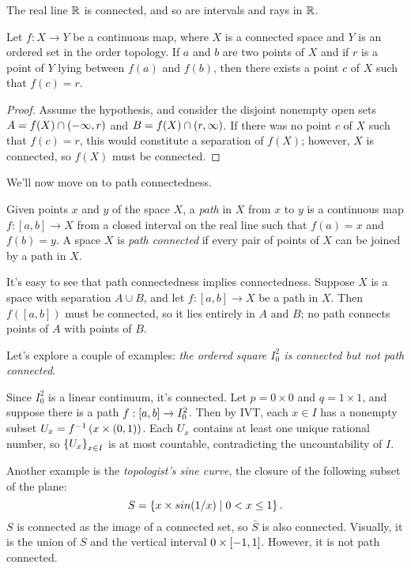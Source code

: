 \documentclass[10pt]{report}
\begin{document}
\begin{corollary}
  The real line $\mathbb{R}$ is connected, and so are intervals and rays in $\mathbb{R}$.
\end{corollary}

\begin{theorem}
  Let $f:X \rightarrow Y$ be a continuous map, where $X$ is a connected space and $Y$ is an ordered set in the order topology.
  If $a$ and $b$ are two points of $X$ and if $r$ is a point of $Y$ lying between $f(a)$ and $f(b)$, then there exists a point $c$ of $X$ such that $f(c) = r$.
\end{theorem}
\begin{proof}
  Assume the hypothesis, and consider the disjoint nonempty open sets $A = f(X) \cap \left( -\infty,r \right)$ and $B = f(X) \cap \left( r,\infty \right)$.
  If there was no point $c$ of $X$ such that $f(c)=r$, this would constitute a separation of $f(X)$; however, $X$ is connected, so $f(X)$ must be connected.
\end{proof}

We'll now move on to path connectedness.

\begin{definition}
  Given points $x$ and $y$ of the space $X$, a \emph{path} in $X$ from $x$ to $y$ is a continuous map $f:[a,b] \rightarrow X$ from a closed interval on the real line such that $f(a) = x$ and $f(b) = y$.
  A space $X$ is \emph{path connected} if every pair of points of $X$ can be joined by a path in $X$.
\end{definition}

It's easy to see that path connectedness implies connectedness.
Suppose $X$ is a space with separation $A \cup B$, and let $f:[a,b] \rightarrow X$ be a path in $X$.
Then $f([a,b])$ must be connected, so it lies entirely in $A$ and $B$; no path connects points of $A$ with points of $B$.

Let's explore a couple of examples: \emph{the ordered square $I_0^2$ is connected but not path connected}.

Since $I_0^2$ is a linear continuum, it's connected. 
Let $p=0 \times 0$ and $q = 1 \times 1$, and suppose there is a path $f:\left[ a,b \right] \rightarrow I_0^2$.
Then by IVT, each $x \in I$ has a nonempty subset $U_x = f^{-1}\left( x \times (0,1) \right)$.
Each $U_x$ contains at least one unique rational number, so $\left\{ U_x \right\}_{x \in I}$ is at most countable, contradicting the uncountability of $I$.

Another example is the \emph{topologist's sine curve}, the closure of the following subset of the plane:
\[
  S = \left\{ x \times sin(1/x) \mid 0 < x \leq 1 \right\}.
\]
$S$ is connected as the image of a connected set, so $\bar S$ is also connected.
Visually, it is the union of $S$ and the vertical interval $0 \times \left[ -1,1 \right]$.
However, it is not path connected.
\end{document}

